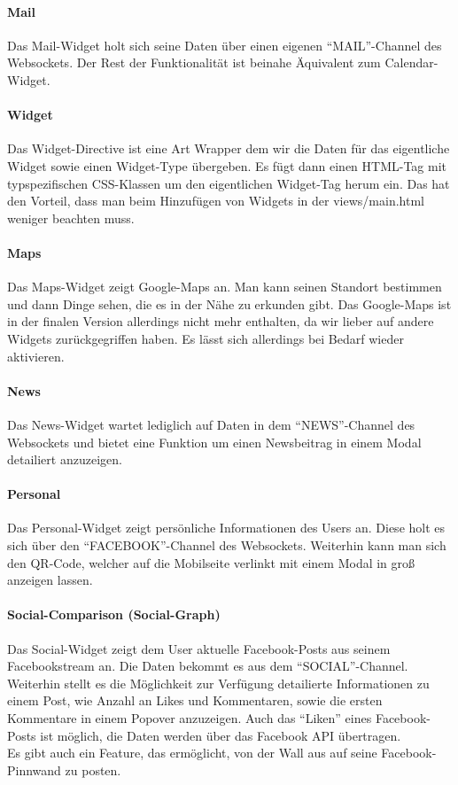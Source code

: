 \documentclass[10pt,a4paper]{report}
\newcommand{\code}[1]{{\fontfamily{cmvtt}\selectfont #1}}
\begin{document}
				\paragraph{Mail} 
					Das Mail-Widget holt sich seine Daten über einen eigenen "`MAIL"'-Channel des Websockets. Der Rest der Funktionalität ist beinahe Äquivalent zum Calendar-Widget.
				\paragraph{Widget}
					Das Widget-Directive ist eine Art Wrapper dem wir die Daten für das eigentliche Widget sowie einen Widget-Type übergeben. Es fügt dann einen HTML-Tag mit typspezifischen CSS-Klassen um den eigentlichen Widget-Tag herum ein. Das hat den Vorteil, dass man beim Hinzufügen von Widgets in der \code{views/main.html} weniger beachten muss.
				\paragraph{Maps}
					Das Maps-Widget zeigt Google-Maps an. Man kann seinen Standort bestimmen und dann Dinge sehen, die es in der Nähe zu erkunden gibt. Das Google-Maps ist in der finalen Version allerdings nicht mehr enthalten, da wir lieber auf andere Widgets zurückgegriffen haben. Es lässt sich allerdings bei Bedarf wieder aktivieren.
				\paragraph{News}
					Das News-Widget wartet lediglich auf Daten in dem "`NEWS"'-Channel des Websockets und bietet eine Funktion um einen Newsbeitrag in einem Modal detailiert anzuzeigen.
				\paragraph{Personal}
					Das Personal-Widget zeigt persönliche Informationen des Users an. Diese holt es sich über den "`FACEBOOK"'-Channel des Websockets. Weiterhin kann man sich den QR-Code, welcher auf die Mobilseite verlinkt mit einem Modal in groß anzeigen lassen.
				\paragraph{Social-Comparison (Social-Graph)}
					Das Social-Widget zeigt dem User aktuelle Facebook-Posts aus seinem Facebookstream an. Die Daten bekommt es aus dem "`SOCIAL"'-Channel. Weiterhin stellt es die Möglichkeit zur Verfügung detailierte Informationen zu einem Post, wie Anzahl an Likes und Kommentaren, sowie die ersten Kommentare in einem Popover anzuzeigen. Auch das "`Liken"' eines Facebook-Posts ist möglich, die Daten werden über das Facebook API übertragen.\\
Es gibt auch ein Feature, das ermöglicht, von der Wall aus auf seine Facebook-Pinnwand zu posten.
\end{document}
